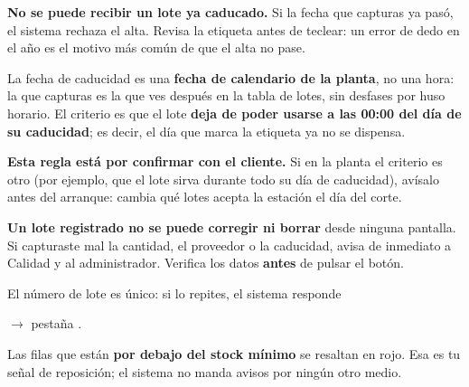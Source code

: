 \begin{cajaOjo}
\textbf{No se puede recibir un lote ya caducado.} Si la fecha que capturas ya pasó,
el sistema rechaza el alta. Revisa la etiqueta antes de teclear: un error de dedo en
el año es el motivo más común de que el alta no pase.
\end{cajaOjo}

\begin{cajaInfo}
La fecha de caducidad es una \textbf{fecha de calendario de la planta}, no una hora:
la que capturas es la que ves después en la tabla de lotes, sin desfases por huso horario.
El criterio es que el lote \textbf{deja de poder usarse a las 00:00 del día de su
caducidad}; es decir, el día que marca la etiqueta ya no se dispensa.

\textbf{Esta regla está por confirmar con el cliente.} Si en la planta el criterio es
otro (por ejemplo, que el lote sirva durante todo su día de caducidad), avísalo antes
del arranque: cambia qué lotes acepta la estación el día del corte.
\end{cajaInfo}

\begin{cajaOjo}
\textbf{Un lote registrado no se puede corregir ni borrar} desde ninguna pantalla.
Si capturaste mal la cantidad, el proveedor o la caducidad, avisa de inmediato a
Calidad y al administrador. Verifica los datos \textbf{antes} de pulsar el botón.
\end{cajaOjo}

\vspace{6pt}

El número de lote es único: si lo repites, el sistema responde

\newpage
{}


 $\rightarrow$ pestaña .


\vspace{6pt}

Las filas que están \textbf{por debajo del stock mínimo} se resaltan en rojo. Esa es tu
señal de reposición; el sistema no manda avisos por ningún otro medio.


